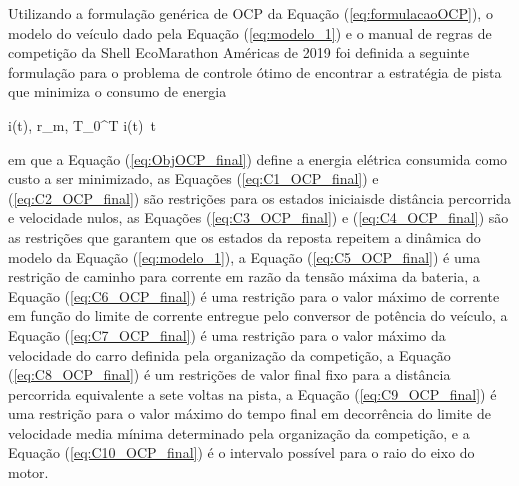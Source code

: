 Utilizando a formulação genérica de OCP da Equação (\ref{eq:formulacaoOCP}), o modelo do veículo dado pela Equação (\ref{eq:modelo_1})
e o manual de regras de competição da Shell EcoMarathon Américas de 2019 
foi definida a seguinte formulação para o problema de controle ótimo de encontrar a estratégia de pista que minimiza o consumo de energia

\begin{mini!}
	{i(t), r_m, T}{\int_{0}^{T} i(t)  \,t \label{eq:ObjOCP_final}}
	{\label{eq:formulacaoOCP_final}}{}
\end{mini!}

em que a Equação (\ref{eq:ObjOCP_final}) define a energia elétrica consumida como custo a ser minimizado, 
as Equações (\ref{eq:C1_OCP_final}) e (\ref{eq:C2_OCP_final}) são restrições para os estados iniciaisde distância  percorrida e velocidade nulos, 
as Equações (\ref{eq:C3_OCP_final}) e (\ref{eq:C4_OCP_final}) são as restrições que garantem que os estados da reposta repeitem a dinâmica do modelo da Equação (\ref{eq:modelo_1}), 
a Equação (\ref{eq:C5_OCP_final}) é uma restrição de caminho para corrente em razão da tensão máxima da bateria, 
a Equação (\ref{eq:C6_OCP_final}) é uma restrição para o valor máximo de corrente em função do limite de corrente entregue pelo conversor de potência do veículo,
a Equação (\ref{eq:C7_OCP_final}) é uma restrição para o valor máximo da velocidade do carro definida pela organização da competição,
a Equação (\ref{eq:C8_OCP_final}) é um restrições de valor final fixo para a distância  percorrida equivalente a sete voltas na pista,
a Equação (\ref{eq:C9_OCP_final}) é uma restrição para o valor máximo do tempo final em decorrência do limite de velocidade media mínima determinado pela organização da competição,
e a Equação (\ref{eq:C10_OCP_final}) é o intervalo possível para o raio do eixo do motor.


